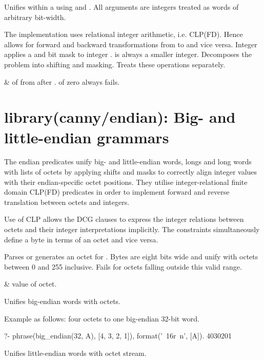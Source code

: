 \begin{description}
Unifies  within a  using  and . All arguments are
integers treated as words of arbitrary bit-width.

The implementation uses relational integer arithmetic, i.e. CLP(FD).
Hence allows for forward and backward transformations from  to
 and vice versa. Integer  applies a  and bit  mask
to integer .  is always a smaller integer. Decomposes the
problem into shifting and masking. Treats these operations
separately.

\begin{arguments}
 & of  from  after .  of zero always
fails. \\
\end{arguments}
\end{description}

\chapter{library(canny/endian): Big- and little-endian grammars}\label{sec:endian}

The endian predicates unify big- and little-endian words, longs and
long words with lists of octets by applying shifts and masks to
correctly align integer values with their endian-specific octet
positions. They utilise integer-relational finite domain CLP(FD)
predicates in order to implement forward and reverse translation
between octets and integers.

Use of CLP allows the DCG clauses to express the integer relations
between octets and their integer interpretations implicitly. The
constraints simultaneously define a byte in terms of an octet and
vice versa.\vspace{0.7cm}

\begin{description}
Parses or generates an octet for . Bytes are eight bits wide and
unify with octets between 0 and 255 inclusive. Fails for octets
falling outside this valid range.

\begin{arguments}
 & value of octet. \\
\end{arguments}

Unifies big-endian words with octets.

Example as follows: four octets to one big-endian 32-bit word.

\begin{code}
?- phrase(big_endian(32, A), [4, 3, 2, 1]),
   format('~16r~n', [A]).
4030201
\end{code}

Unifies little-endian words with octet stream.
\end{description}

